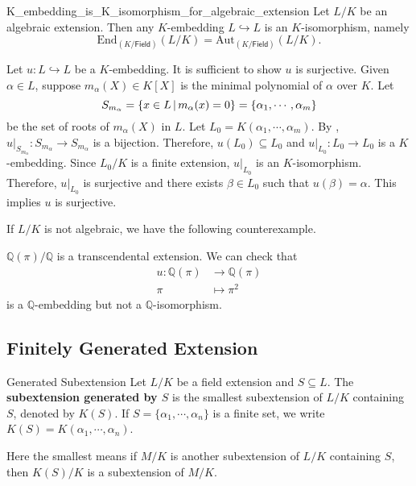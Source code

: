 \begin{proposition}{}{K_embedding_is_K_isomorphism_for_algebraic_extension}
    Let $L/K$ be an algebraic extension. Then any $K$-embedding $L\hookrightarrow L$ is an $K$-isomorphism, namely
    \[
    \mathrm{End}_{\left(K/\mathsf{Field}\right)}\left(L/K\right) = \mathrm{Aut}_{\left(K/\mathsf{Field}\right)}\left(L/K\right).
    \]
\end{proposition}
\begin{prf}
    Let $u:L\hookrightarrow L$ be a $K$-embedding. It is sufficient to show $u$ is surjective. Given $\alpha\in L$, suppose $m_\alpha(X)\in K[X]$ is the minimal polynomial of $\alpha$ over $K$. Let
    \[
    S_{m_\alpha}=\left\{x \in L\,\middle\vert\, m_\alpha(x)=0\right\}=\{ \alpha_1,\cdots,\alpha_m\}
    \]
    be the set of roots of $m_\alpha(X)$ in $L$. Let $L_0=K(\alpha_1,\cdots,\alpha_m)$.
    By , $u|_{S_{m_\alpha}}:S_{m_\alpha}\to S_{m_\alpha}$ is a bijection. Therefore, $u(L_0)\subseteq L_0$ and $u|_{L_0}:L_0\to L_0$ is a $K$-embedding. Since $L_0/K$ is a finite extension, $u|_{L_0}$ is an $K$-isomorphism. Therefore, $u|_{L_0}$ is surjective and there exists $\beta\in L_0$ such that $u(\beta)=\alpha$. This implies $u$ is surjective.
\end{prf}
If $L/K$ is not algebraic, we have the following counterexample.
\begin{example}{}{}
    $\mathbb{Q}(\pi)/\mathbb{Q}$ is a transcendental extension. We can check that 
    \begin{align*}
        u:\mathbb{Q}(\pi)&\longrightarrow \mathbb{Q}(\pi)\\
        \pi&\longmapsto \pi^2
    \end{align*}
    is a $\mathbb{Q}$-embedding but not a $\mathbb{Q}$-isomorphism.
\end{example}

\subsection{Finitely Generated Extension}


\begin{definition}{Generated Subextension}{}
    Let $L/K$ be a field extension and $S\subseteq L$. The \textbf{subextension generated by $S$} is the smallest subextension of $L/K$ containing $S$, denoted by $K(S)$. If $S=\{\alpha_1,\cdots,\alpha_n\}$ is a finite set, we write $K(S)=K(\alpha_1,\cdots,\alpha_n)$.
\end{definition}
\begin{prf}
    Here the smallest means if $M/K$ is another subextension of $L/K$ containing $S$, then $K(S)/K$ is a subextension of $M/K$.
\end{prf}

